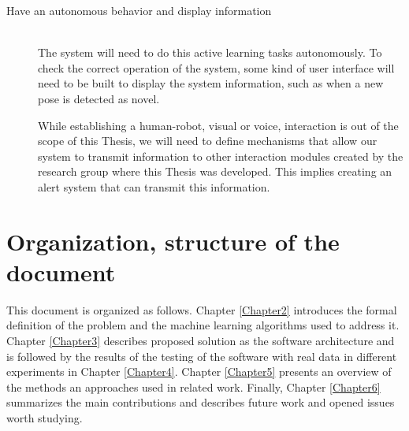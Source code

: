 \begin{description}
  \item[Have an autonomous behavior and display information] \hfill \\
The system will need to do this active learning tasks autonomously. To check the correct operation of the system, some kind of user interface will need to be built to display the system information, such as when a new pose is detected as novel.

While establishing a human-robot, visual or voice, interaction is out of the scope of this Thesis, we will need to define mechanisms that allow our system to transmit information to other interaction modules created by the research group where this Thesis was developed. This implies creating an alert system that can transmit this information.  


\end{description}

\clearpage
\section{Organization, structure of the document}

This document is organized as follows. Chapter \ref{Chapter2} introduces the formal definition of the problem and the machine learning algorithms used to address it. Chapter \ref{Chapter3} describes proposed solution as the software architecture and is followed by the results of the testing of the software with real data in different experiments in Chapter \ref{Chapter4}. Chapter \ref{Chapter5} presents an overview of the methods an approaches used in related work. Finally, Chapter \ref{Chapter6} summarizes the main contributions and describes future work and opened issues worth studying.

\begin{flushright}

\end{flushright}
